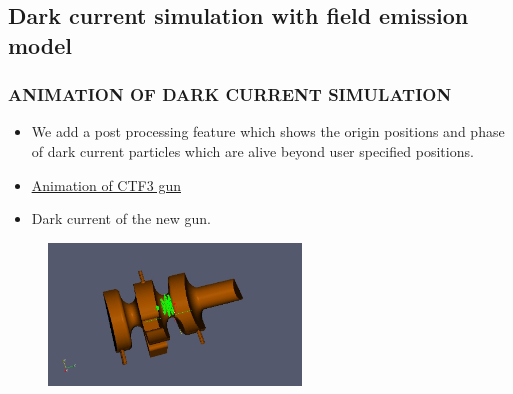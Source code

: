 \documentclass{beamer}
\begin{document}
\subsection{Dark current simulation with field emission model}
\begin{frame}
\frametitle{ANIMATION OF DARK CURRENT SIMULATION}
\begin{itemize}
\item We add a post processing feature which shows the origin positions and phase of dark current particles which are alive beyond user specified positions.
\pause
\item \href{run:alivetest.avi}{\underline{Animation of CTF3 gun} }%
\pause
\item Dark current of the new gun.
\end{itemize}
\pause
\begin{figure}[H]
\begin{center}
\includegraphics[width=0.6\textwidth]{newgun.jpeg}
\end{center}
\end{figure}
\end{frame}
\end{document}
